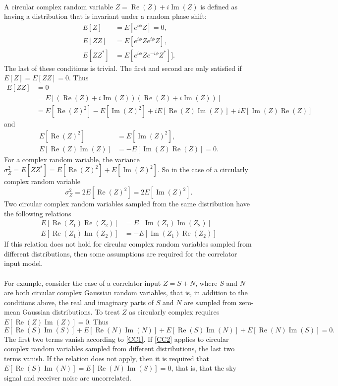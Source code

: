 \documentclass[11pt]{article}
\renewcommand{\Re}{\operatorname{Re}}
\renewcommand{\Im}{\operatorname{Im}}
\begin{document}
\paragraph{}A circular complex random variable $Z=\Re(Z)+i\Im(Z)$ is defined as having a distribution that is invariant under a random phase shift:
\begin{align}
E[Z]&=E[e^{i\phi}Z]=0,\\
E[ZZ]&=E[e^{i\phi}Ze^{i\phi}Z],\\
E[ZZ^*]&=E[e^{i\phi}Ze^{-i\phi}Z^*]].
\end{align}
The last of these conditions is trivial. The first and second are only satisfied if $E[Z]=E[ZZ]=0$. Thus
\begin{align}
E[ZZ]&=0\\
&=E[(\Re(Z)+i\Im(Z))(\Re(Z)+i\Im(Z))]\\
&=E[\Re(Z)^2]-E[\Im(Z)^2]+iE[\Re(Z)\Im(Z)]+iE[\Im(Z)\Re(Z)]
\end{align}
and
\begin{align}
E[\Re(Z)^2]&=E[\Im(Z)^2],\\
E[\Re(Z)\Im(Z)]&=-E[\Im(Z)\Re(Z)]=0\label{CC1}.
\end{align}
For a complex random variable, the variance $\sigma_Z^2=E[ZZ^*]=E[\Re(Z)^2]+E[\Im(Z)^2]$. So in the case of a circularly complex random variable
\begin{equation}
\sigma_Z^2=2E[\Re(Z)^2]=2E[\Im(Z)^2].
\end{equation}
Two circular complex random variables sampled from the same distribution have the following relations
\begin{align}
E[\Re(Z_1)\Re(Z_2)]&=E[\Im(Z_1)\Im(Z_2)]\\
E[\Re(Z_1)\Im(Z_2)]&=-E[\Im(Z_1)\Re(Z_2)]\label{CC2}
\end{align}
If this relation does not hold for circular complex random variables sampled from different distributions, then some assumptions are required for the correlator input model.
\paragraph{}For example, consider the case of a correlator input $Z=S+N$, where $S$ and $N$ are both circular complex Gaussian random variables, that is, in addition to the conditions above, the real and imaginary parts of $S$ and $N$ are sampled from zero-mean Gaussian distributions. To treat $Z$ as circularly complex requires $E[\Re(Z)\Im(Z)]=0$. Thus
\begin{equation}
E[\Re(S)\Im(S)]+E[\Re(N)\Im(N)]+E[\Re(S)\Im(N)]+E[\Re(N)\Im(S)]=0.
\end{equation}
The first two terms vanish according to \eqref{CC1}. If \eqref{CC2} applies to circular complex random variables sampled from different distributions, the last two terms vanish. If the relation does not apply, then it is required that $E[\Re(S)\Im(N)]=E[\Re(N)\Im(S)]=0$, that is, that the sky signal and receiver noise are uncorrelated. 
\nocite{*}
\printbibliography
%
\end{document}
